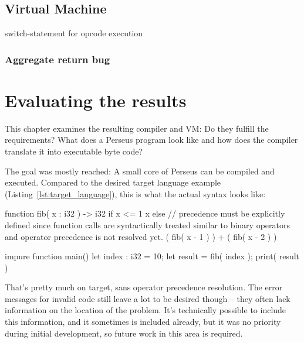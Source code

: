 	\section{Virtual Machine}
	
		switch-statement for opcode execution
		
		\subsection{Aggregate return bug}


\chapter{Evaluating the results}
This chapter examines the resulting compiler and VM: Do they fulfill the requirements? What does a Perseus program look like and how does the compiler translate it into executable byte code?

The goal was mostly reached: A small core of Perseus can be compiled and executed. Compared to the desired target language example (Listing~\ref{lst:target_language}), this is what the actual syntax looks like:

\begin{perseuslisting}[caption={Actual resulting language example},label={lst:result_language}]
function fib( x : i32 ) -> i32
    if x <= 1
        x
    else
    	// precedence must be explicitly defined since function calls are syntactically treated similar to binary operators and operator precedence is not resolved yet.
        ( fib( x - 1 ) ) + ( fib( x - 2 ) )

impure function main()
{
	let index : i32 = 10;
	let result = fib( index );
	print( result )
}
\end{perseuslisting}

That's pretty much on target, sans operator precedence resolution. The error messages for invalid code still leave a lot to be desired though -- they often lack information on the location of the problem. It's technically possible to include this information, and it sometimes is included already, but it was no priority during initial development, so future work in this area is required.

